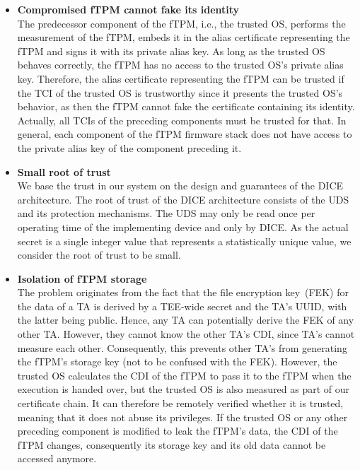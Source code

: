 \begin{itemize}
    \item{\textbf{Compromised fTPM cannot fake its identity}\\
    The predecessor component of the fTPM, i.e., the trusted OS, performs the measurement of the fTPM, embeds it in the alias certificate representing the fTPM and signs it with its private alias key.
    As long as the trusted OS behaves correctly, the fTPM has no access to the trusted OS's private alias key.
    Therefore, the alias certificate representing the fTPM can be trusted if the TCI of the trusted OS is trustworthy since it presents the trusted OS's behavior, as then the fTPM cannot fake the certificate containing its identity.
    Actually, all TCIs of the preceding components must be trusted for that.
    In general, each component of the fTPM firmware stack does not have access to the private alias key of the component preceding it.}

    \item{\textbf{Small root of trust}\\
    We base the trust in our system on the design and guarantees of the DICE architecture.
    The root of trust of the DICE architecture consists of the \ac{UDS} and its protection mechanisms.
    The \ac{UDS} may only be read once per operating time of the implementing device and only by DICE\@.
    As the actual secret is a single integer value that represents a statistically unique value, we consider the root of trust to be small.}

    \item{\textbf{Isolation of fTPM storage}\\
    The problem originates from the fact that the file encryption key~(FEK) for the data of a TA is derived by a TEE-wide secret and the TA's UUID, with the latter being public.
    Hence, any TA can potentially derive the FEK of any other TA\@.
    However, they cannot know the other TA's CDI, since TA's cannot measure each other.
    Consequently, this prevents other TA's from generating the fTPM's storage key (not to be confused with the FEK).
    However, the trusted OS calculates the CDI of the fTPM to pass it to the fTPM when the execution is handed over, but the trusted OS is also measured as part of our certificate chain.
    It can therefore be remotely verified whether it is trusted, meaning that it does not abuse its privileges.
    If the trusted OS or any other preceding component is modified to leak the fTPM's data, the CDI of the fTPM changes, consequently its storage key and its old data cannot be accessed anymore.}


\end{itemize}
